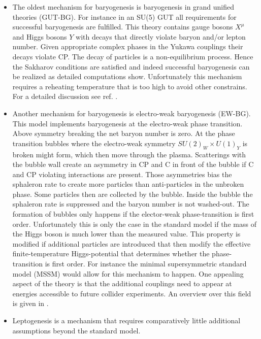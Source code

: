 \documentclass[13pt,a4paper,twoside,titlepage]{article}
\begin{document}
\begin{itemize}
    \item The oldest mechanism for baryogenesis is baryogenesis in grand unified theories (GUT-BG).
    For instance in an SU(5) GUT all requirements for successful baryogenesis are
    fulfilled. This theory contains gauge bosons $X^\mu$ and Higgs bosons $Y$ with decays that directly
    violate baryon and/or lepton number. Given appropriate complex phases in the Yukawa couplings
    their decays violate CP. The decay of particles is a non-equilibrium process. Hence the Sakharov conditions are satisfied and indeed successful baryogenesis can be realized as detailed computations show.
    Unfortunately this mechanism requires a reheating temperature that is too high to avoid other constrains. For a detailed discussion see ref. \cite[sec. 3]{Dine_2003_Bayrogenesis}.
    \item Another mechanism for baryogenesis is electro-weak baryogenesis (EW-BG).
    This model implements baryogenesis at the electro-weak phase transition.
    Above symmetry breaking the net baryon number is zero.
    At the phase transition bubbles where the electro-weak symmetry $SU(2)_W \times U(1)_Y$ is broken might form, which then
    move through the plasma.
    Scatterings with the bubble wall create an asymmetry in CP and C in front of the bubble if C and CP violating interactions are present.
    Those asymmetries bias the sphaleron rate to create more particles than anti-particles in the unbroken phase.
    Some particles then are collected by the bubble. Inside the bubble the sphaleron rate is suppressed and the
    baryon number is not washed-out.
    The formation of bubbles only happens if the elector-weak phase-transition is first order.
    Unfortunately this is only the case in the standard model if the mass of the Higgs boson is much lower than
    the measured value.
    This property is modified if additional particles are introduced that then modify the effective finite-temperature
    Higgs-potential that determines whether the phase-transition is first order.
    For instance the minimal supersymmetric standard model (MSSM) would allow for this mechanism to happen.
    One appealing aspect of the theory is that the additional couplings need to appear at energies accessible to future collider
    experiments. An overview over this field is given in \cite{Electroweak_baryogenesis_Morrissey_2012}.
    \item Leptogenesis is a mechanism that requires comparatively little additional assumptions beyond the standard model.

\end{itemize}
\end{document}
